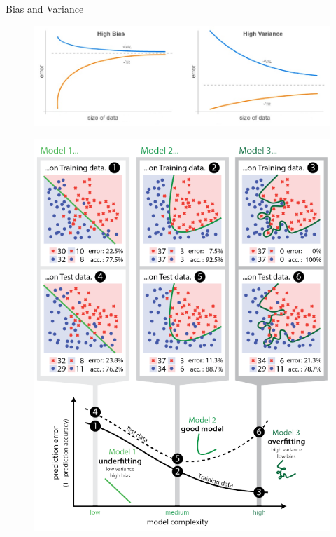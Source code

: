 \begin{frame}{Bias and Variance}{}
	\begin{figure}
		\centering
		\includegraphics[scale=0.55]{09_evaluation/02_img/bias_variance}
	\end{figure}
\end{frame}


\begin{frame}[plain]{}{}
	\begin{figure}
		\centering
		\includegraphics[scale=1.3]{09_evaluation/02_img/under_overfitting}
	\end{figure}
\end{frame}


